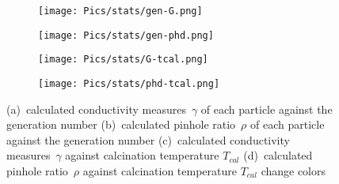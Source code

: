 \begin{figure}[hb]
    \centering
    \begin{subfigure}{.44\textwidth}
        \centering
        \texttt{[image: Pics/stats/gen-G.png]}
        \caption{} \label{fig:emma-G-gen}
    \end{subfigure}
    \begin{subfigure}{.44\textwidth}
        \centering
        \texttt{[image: Pics/stats/gen-phd.png]}
        \caption{} \label{fig:emma-phd-gen}
    \end{subfigure}
    \begin{subfigure}{.44\textwidth}
        \centering
        \texttt{[image: Pics/stats/G-tcal.png]}
        \caption{} \label{fig:g-tcal}
    \end{subfigure}
    \begin{subfigure}{.44\textwidth}
        \centering
        \texttt{[image: Pics/stats/phd-tcal.png]}
        \caption{} \label{fig:phd-tcal}
    \end{subfigure}
	\caption{
		(a)~calculated conductivity measures~$\gamma$ of each particle against the generation number %
		(b)~calculated pinhole ratio~$\rho$ of each particle against the generation number %
		(c)~calculated conductivity measures~$\gamma$ against calcination temperature $T_{cal}$
		(d)~calculated pinhole ratio~$\rho$ against calcination temperature $T_{cal}$
	change colors }

    \label{fig:emma-gen}
\end{figure}

